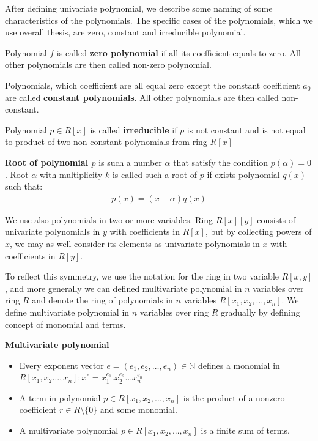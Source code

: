 \documentclass[
  digital, %
  twoside, %
  table,   %
  nolof,     %
  nolot,     %
]{fithesis3}
\begin{document}
After defining univariate polynomial, we describe some naming of some characteristics of the polynomials. The specific cases of the polynomials, which we use overall thesis,  are zero, constant and irreducible polynomial.  
\begin{definition}
Polynomial $f$ is called \textbf{zero polynomial} if all its coefficient equals to zero. All other polynomials are then called non-zero polynomial.
\end{definition}

\begin{definition}
Polynomials, which coefficient are all equal zero except the constant coefficient $a_0$ are called \textbf{constant polynomials}. All other polynomials are then called non-constant.
\end{definition}

\begin{definition}
Polynomial $p \in R[x]$ is called \textbf{irreducible} if $p$ is not constant and is not equal to product of two non-constant polynomials from ring $R[x]$
\end{definition}

\begin{definition}
\textbf{Root of polynomial $p$} is such a number $\alpha$ that satisfy the condition $p(\alpha) = 0$. Root $\alpha$ with multiplicity $k$ is called such a root of $p$ if exists polynomial $q(x)$ such that:
\begin{align*}
p(x) =  (x - \alpha)q(x)
\end{align*}
\end{definition}

We use also polynomials in two or more variables. Ring $R[x][y]$ consists of univariate polynomials in $y$ with coefficients in $R[x]$, but by collecting powers of $x$, we may as well consider its elements as univariate polynomials in $x$ with coefficients in $R[y]$. 

To reflect this symmetry, we use the notation for the ring in two variable $R[x,y]$, and more generally we can defined multivariate polynomial in $n$ variables over ring $R$ and denote the ring of polynomials in $n$ variables $R[x_1, x_2, \dots, x_n]$. We define multivariate polynomial in $n$ variables over ring $R$ gradually by defining concept of monomial and terms.

\begin{definition}{\textbf{Multivariate polynomial}}

\begin{itemize} 
  \item Every exponent vector $e  = (e_1, e_2, \dots, e_n) \in \mathbb{N}$ defines a monomial in $R[x_1, x_2 \dots, x_n]: x^e = x_1^{e_1} . x_2^{e_2}  \dots x_n^{e_n}$
  \item A term in polynomial $p \in R[x_1, x_2, . . . , x_n]$ is the product of a nonzero coefficient $r \in R \setminus \{0\}$ and some monomial.
  \item A multivariate polynomial $p \in R[x_1, x_2, . . . , x_n]$ is a finite sum of terms.
\end{itemize}

\end{definition}
\end{document}
